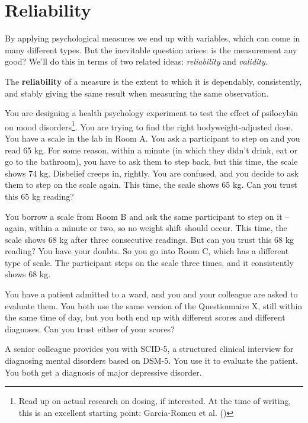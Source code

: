\documentclass[
  11pt,
  a4paper,
  twoside,symmetric,openright]{book}
\theoremstyle{break}
\theoremstyle{break}
\begin{document}
\section{Reliability}\label{reliability}

By applying psychological measures we end up with variables, which can come in many different types. But the inevitable question arises: is the measurement any good? We'll do this in terms of two related ideas: \emph{reliability} and \emph{validity}.

\begin{definition}[Reliability]
\protect\hypertarget{def:defreliability}{}\label{def:defreliability}The \textbf{reliability} of a measure is the extent to which it is dependably, consistently, and stably giving the same result when measuring the same observation.
\end{definition}

\begin{example}
\protect\hypertarget{exm:exreliability1}{}\label{exm:exreliability1}You are designing a health psychology experiment to test the effect of psilocybin on mood disorders\footnote{Read up on actual research on dosing, if interested. At the time of writing, this is an excellent starting point: Garcia-Romeu et al. ()}. You are trying to find the right bodyweight-adjusted dose. You have a scale in the lab in Room A. You ask a participant to step on and you read 65 kg. For some reason, within a minute (in which they didn't drink, eat or go to the bathroom), you have to ask them to step back, but this time, the scale shows 74 kg. Disbelief creeps in, rightly. You are confused, and you decide to ask them to step on the scale again. This time, the scale shows 65 kg. Can you trust this 65 kg reading?

You borrow a scale from Room B and ask the same participant to step on it -- again, within a minute or two, so no weight shift should occur. This time, the scale shows 68 kg after three consecutive readings. But can you trust this 68 kg reading? You have your doubts. So you go into Room C, which has a different type of scale. The participant steps on the scale three times, and it consistently shows 68 kg.
\end{example}

\begin{example}
\protect\hypertarget{exm:exreliability2}{}\label{exm:exreliability2}You have a patient admitted to a ward, and you and your colleague are asked to evaluate them. You both use the same version of the Questionnaire X, still within the same time of day, but you both end up with different scores and different diagnoses. Can you trust either of your scores?

A senior colleague provides you with SCID-5, a structured clinical interview for diagnosing mental disorders based on DSM-5. You use it to evaluate the patient. You both get a diagnosis of major depressive disorder.
\end{example}
\end{document}
